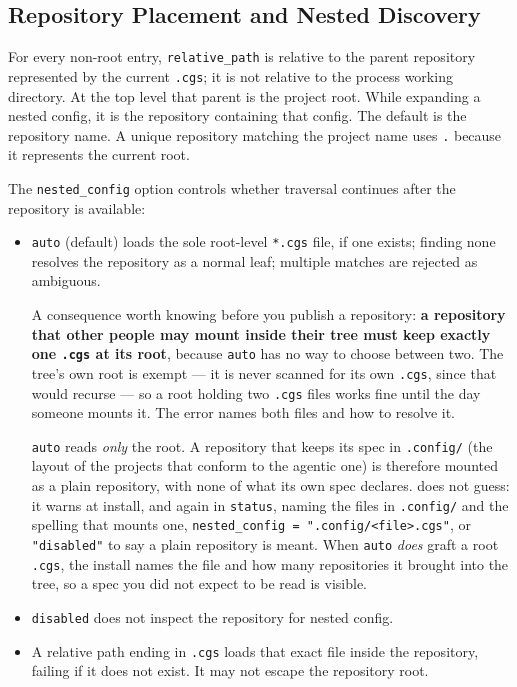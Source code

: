 \subsection{Repository Placement and Nested Discovery}

For every non-root entry, \texttt{relative\_path} is relative to the parent
repository represented by the current \texttt{.cgs}; it is not relative to
the process working directory. At the top level that parent is the project
root. While expanding a nested config, it is the repository containing that
config. The default is the repository name. A unique repository matching the
project name uses \texttt{.} because it represents the current root.

The \texttt{nested\_config} option controls whether traversal continues after
the repository is available:

\begin{itemize}
  \item \texttt{auto} (default) loads the sole root-level \texttt{*.cgs} file,
        if one exists; finding none resolves the repository as a normal
        leaf; multiple matches are rejected as ambiguous.

        A consequence worth knowing before you publish a repository: \textbf{a
        repository that other people may mount inside their tree must keep
        exactly one \texttt{.cgs} at its root}, because \texttt{auto} has no
        way to choose between two. The tree's own root is exempt --- it is
        never scanned for its own \texttt{.cgs}, since that would recurse ---
        so a root holding two \texttt{.cgs} files works fine until the day
        someone mounts it. The error names both files and how to resolve it.

        \texttt{auto} reads \emph{only} the root. A repository that keeps its
        spec in \texttt{.config/} (the layout of the projects that conform to the
        agentic one) is therefore mounted as a plain repository, with none of what
        its own spec declares. \cgscli{} does not guess: it warns at install, and
        again in \texttt{status}, naming the files in \texttt{.config/} and the
        spelling that mounts one, \texttt{nested\_config = ".config/<file>.cgs"},
        or \texttt{"disabled"} to say a plain repository is meant. When \texttt{auto}
        \emph{does} graft a root \texttt{.cgs}, the install names the file and how
        many repositories it brought into the tree, so a spec you did not expect to
        be read is visible.
  \item \texttt{disabled} does not inspect the repository for nested config.
  \item A relative path ending in \texttt{.cgs} loads that exact file inside
        the repository, failing if it does not exist. It may not escape the
        repository root.
\end{itemize}

